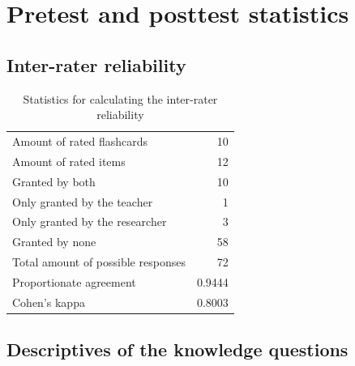 \chapter{Pretest and posttest statistics}
\label{app:learning_gain}

\section{Inter-rater reliability}

\begin{table}
    \centering
    \begin{tabular}{lr}
        Amount of rated flashcards         & 10 \\
        Amount of rated items              & 12 \\
        Granted by both                    & 10 \\
        Only granted by the teacher        &  1 \\
        Only granted by the researcher     &  3 \\
        Granted by none                    & 58 \\
        Total amount of possible responses & 72 \\
        Proportionate agreement            & 0.9444 \\
        Cohen's kappa                      & 0.8003 \\
    \end{tabular}
    \caption{Statistics for calculating the inter-rater reliability}
    \label{tab:irr}
\end{table}

\FloatBarrier
\section{Descriptives of the knowledge questions}

